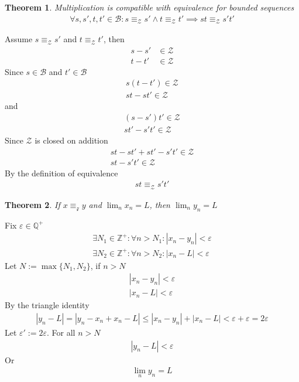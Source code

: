 \documentclass{amsart}
\numberwithin{equation}{section}
\let\oldendproof\endproof
\renewenvironment{proof}[1][\proofname]{%
  \setcounter{case}{0}
  \setcounter{step}{0}
  \oldproof[#1]%
}{\oldendproof}
\theoremstyle{plain}
\newtheorem{theorem}{Theorem}[section]
\theoremstyle{definition}
\theoremstyle{remark}
\begin{document}
\begin{theorem}
  Multiplication is compatible with equivalence for bounded sequences
  \begin{align}
    \forall s,s',t,t'\in\mathcal{B}:s\equiv_\mathcal{Z} s' \land t\equiv_\mathcal{Z} t' \implies st \equiv_\mathcal{Z} s't'
  \end{align}
\end{theorem}
\begin{proof}
  Assume $s\equiv_\mathcal{Z} s'$ and $t\equiv_\mathcal{Z} t'$, then
  \begin{align}
    s-s'&\in\mathcal{Z}\\
    t-t'&\in\mathcal{Z}
  \end{align}
  Since $s\in\mathcal{B}$ and $t'\in\mathcal{B}$
  \begin{align}
    s(t-t')\in\mathcal{Z}\\
    st-st'\in\mathcal{Z}
  \end{align}
  and
  \begin{align}
    (s-s')t'\in\mathcal{Z}\\
    st'-s't'\in\mathcal{Z}
  \end{align}
  Since $\mathcal{Z}$ is closed on addition
  \begin{align}
    st-st'+st'-s't'\in\mathcal{Z}\\
    st-s't'\in\mathcal{Z}
  \end{align}
  By the definition of equivalence
  \begin{align}
    st \equiv_\mathcal{Z} s't'
  \end{align}
\end{proof}

\begin{theorem}
  If $x\equiv_\mathcal{z} y$ and $\lim_n x_n = L$, then $\lim_n y_n = L$
\end{theorem}
\begin{proof}
  Fix $\varepsilon\in\mathbb{Q}^+$
  \begin{align}
    \exists N_1\in\mathbb{Z}^+: \forall n> N_1: |x_n - y_n|< \varepsilon\\
    \exists N_2\in\mathbb{Z}^+: \forall n> N_2: |x_n - L| < \varepsilon
  \end{align}
  Let $N:= \max\{N_1, N_2\}$, if $n>N$
  \begin{align}
    |x_n-y_n| < \varepsilon\\
    |x_n - L| < \varepsilon
  \end{align}
  By the triangle identity
  \begin{align}
    |y_n-L | = |y_n-x_n+x_n-L| \leq |x_n-y_n| + |x_n- L| < \varepsilon +  \varepsilon = 2\varepsilon
  \end{align}
  Let $\varepsilon':= 2\varepsilon$. For all $n>N$
  \begin{align}
    |y_n-L| < \varepsilon
  \end{align}
  Or
  \begin{align}
    \lim_n y_n = L
  \end{align}
\end{proof}
\end{document}
